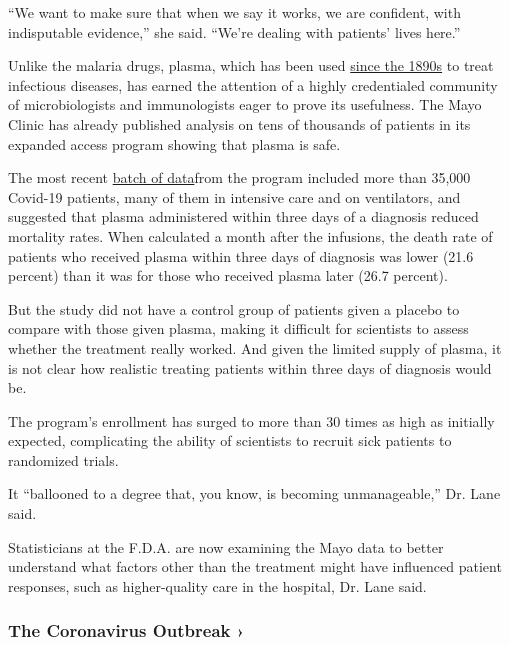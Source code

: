 ``We want to make sure that when we say it works, we are confident, with
indisputable evidence,'' she said. ``We're dealing with patients' lives
here.''

Unlike the malaria drugs, plasma, which has been used
\href{https://www.ncbi.nlm.nih.gov/pmc/articles/PMC4781783/}{since the
1890s} to treat infectious diseases, has earned the attention of a
highly credentialed community of microbiologists and immunologists eager
to prove its usefulness. The Mayo Clinic has already published analysis
on tens of thousands of patients in its expanded access program showing
that plasma is safe.

The most recent
\href{https://www.medrxiv.org/content/10.1101/2020.08.12.20169359v1}{batch
of data}from the program included more than 35,000 Covid-19 patients,
many of them in intensive care and on ventilators, and suggested that
plasma administered within three days of a diagnosis reduced mortality
rates. When calculated a month after the infusions, the death rate of
patients who received plasma within three days of diagnosis was lower
(21.6 percent) than it was for those who received plasma later (26.7
percent).

But the study did not have a control group of patients given a placebo
to compare with those given plasma, making it difficult for scientists
to assess whether the treatment really worked. And given the limited
supply of plasma, it is not clear how realistic treating patients within
three days of diagnosis would be.

The program's enrollment has surged to more than 30 times as high as
initially expected, complicating the ability of scientists to recruit
sick patients to randomized trials.

It ``ballooned to a degree that, you know, is becoming unmanageable,''
Dr. Lane said.

Statisticians at the F.D.A. are now examining the Mayo data to better
understand what factors other than the treatment might have influenced
patient responses, such as higher-quality care in the hospital, Dr. Lane
said.

\href{https://www.nytimes3xbfgragh.onion/news-event/coronavirus?action=click\&pgtype=Article\&state=default\&region=MAIN_CONTENT_3\&context=storylines_faq}{}

\hypertarget{the-coronavirus-outbreak-}{%
\subsubsection{The Coronavirus Outbreak
›}\label{the-coronavirus-outbreak-}}

